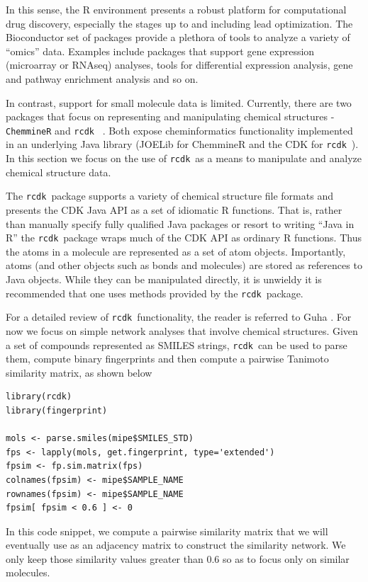 \documentclass[]{book}
\newcommand{\rcdk}{\texttt{rcdk}\ }
\begin{document}
In this sense, the R environment presents a robust platform for
computational drug discovery, especially the stages up to and
including lead optimization. The Bioconductor set of packages provide
a plethora of tools to analyze a variety of ``omics'' data. Examples
include packages that support gene expression (microarray or RNAseq)
analyses, tools for differential expression analysis, gene and pathway
enrichment analysis and so on. 

In contrast, support for small molecule data is limited. Currently,
there are two packages that focus on representing and manipulating
chemical structures - \texttt{ChemmineR} \cite{Cao:2008fj} and \rcdk
\cite{Guha:2007aa}. Both expose cheminformatics functionality
implemented in an underlying Java library (JOELib for ChemmineR and
the CDK for \rcdk). In this section we focus on the use of \rcdk as a
means to manipulate and analyze chemical structure data.

The \rcdk package supports a variety of chemical structure file
formats and presents the CDK Java API as a set of idiomatic R
functions. That is, rather than manually specify fully qualified Java
packages or resort to writing ``Java in R'' the \rcdk package wraps
much of the CDK API as ordinary R functions. Thus the atoms in a
molecule are represented as a set of atom objects. Importantly, atoms
(and other objects such as bonds and molecules) are stored as
references to Java objects. While they can be manipulated directly, it
is unwieldy it is recommended that one uses methods provided by the
\rcdk package.

For a detailed review of \rcdk functionality, the reader is referred
to Guha \cite{Guha:2007aa}. For now we focus on simple network
analyses that involve chemical structures. Given a set of compounds
represented as SMILES strings, \rcdk can be used to parse them,
compute binary fingerprints and then compute a pairwise Tanimoto
similarity matrix, as shown below
\begin{lstlisting}
library(rcdk)
library(fingerprint)

mols <- parse.smiles(mipe$SMILES_STD)
fps <- lapply(mols, get.fingerprint, type='extended')
fpsim <- fp.sim.matrix(fps)
colnames(fpsim) <- mipe$SAMPLE_NAME
rownames(fpsim) <- mipe$SAMPLE_NAME
fpsim[ fpsim < 0.6 ] <- 0
\end{lstlisting}
In this code snippet, we compute a pairwise similarity matrix that we
will eventually use as an adjacency matrix to construct the similarity
network. We only keep those similarity values greater than 0.6 so as
to focus only on similar molecules. 
\end{document}
